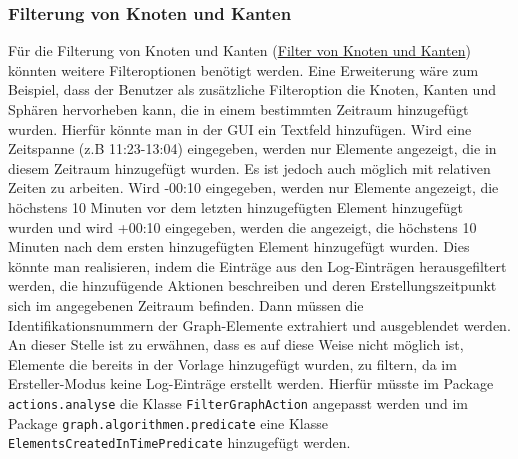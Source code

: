 \documentclass[enabledeprecatedfontcommands,fontsize=11pt,paper=a4,twoside]{scrartcl}
\newcounter{one}
\begin{document}
\subsubsection{Filterung von Knoten und Kanten}
Für die Filterung von Knoten und Kanten (\hyperlink{ss}{Filter von Knoten und Kanten}) könnten weitere Filteroptionen benötigt werden. Eine Erweiterung wäre zum Beispiel, dass der Benutzer als zusätzliche Filteroption die Knoten, Kanten und Sphären hervorheben kann, die in einem bestimmten Zeitraum hinzugefügt wurden. Hierfür könnte man in der GUI  ein Textfeld hinzufügen. Wird eine Zeitspanne (z.B 11:23-13:04) eingegeben, werden nur Elemente angezeigt, die in diesem Zeitraum hinzugefügt wurden. Es ist jedoch auch möglich mit relativen Zeiten zu arbeiten. Wird -00:10 eingegeben, werden nur Elemente angezeigt, die höchstens 10 Minuten vor dem letzten hinzugefügten Element hinzugefügt wurden und wird +00:10 eingegeben, werden die angezeigt, die höchstens 10 Minuten nach dem ersten hinzugefügten Element hinzugefügt wurden. Dies könnte man realisieren, indem die Einträge aus den Log-Einträgen herausgefiltert werden, die hinzufügende Aktionen beschreiben und deren Erstellungszeitpunkt sich im angegebenen Zeitraum befinden. Dann müssen die Identifikationsnummern der Graph-Elemente extrahiert und ausgeblendet werden. An dieser Stelle ist zu erwähnen, dass es auf diese Weise nicht möglich ist, Elemente die bereits in der Vorlage hinzugefügt wurden, zu filtern, da im Ersteller-Modus keine Log-Einträge erstellt werden. Hierfür müsste im Package \texttt{actions.analyse} die Klasse \texttt{FilterGraphAction} angepasst werden und im Package \texttt{graph.algorithmen.predicate} eine Klasse \texttt{ElementsCreatedInTimePredicate} hinzugefügt werden. \\
\end{document}
